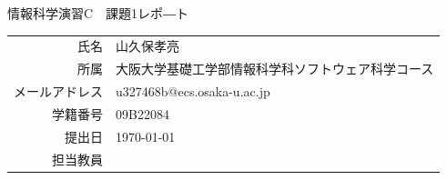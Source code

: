 \documentclass[dvipdfmx]{jarticle}
\begin{document}
\begin{titlepage}
    \begin{center}
        {\huge 情報科学演習C　課題1レポ―ト}
        \vspace{180pt}\\
        \begin{tabular}{rl}
            氏名 & 山久保孝亮\\
            所属 & 大阪大学基礎工学部情報科学科ソフトウェア科学コース\\
            メールアドレス & u327468b@ecs.osaka-u.ac.jp\\
            学籍番号 & 09B22084\\
            提出日 & \today\\
            担当教員 & 
        \end{tabular}
    \end{center}
\end{titlepage}
\end{document}
